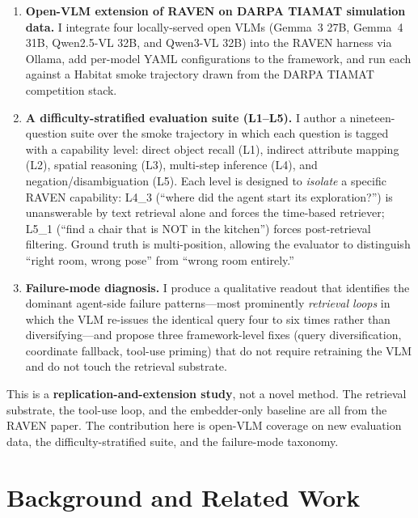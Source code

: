 \documentclass[12pt,letterpaper,oneside]{article}
\begin{document}
\begin{enumerate}
  \item \textbf{Open-VLM extension of RAVEN on DARPA TIAMAT
    simulation data.}  I integrate four locally-served open VLMs
    (Gemma~3 27B, Gemma~4 31B, Qwen2.5-VL 32B, and Qwen3-VL 32B) into
    the RAVEN harness via Ollama, add per-model YAML configurations
    to the framework, and run each against a Habitat smoke trajectory
    drawn from the DARPA TIAMAT competition stack.

  \item \textbf{A difficulty-stratified evaluation suite (L1--L5).} I
    author a nineteen-question suite over the smoke trajectory in
    which each question is tagged with a capability level: direct
    object recall (L1), indirect attribute mapping (L2), spatial
    reasoning (L3), multi-step inference (L4), and
    negation/disambiguation (L5).  Each level is designed to
    \emph{isolate} a specific RAVEN capability: L4\_3 (``where did the
    agent start its exploration?'') is unanswerable by text retrieval
    alone and forces the time-based retriever; L5\_1 (``find a chair
    that is NOT in the kitchen'') forces post-retrieval filtering.
    Ground truth is multi-position, allowing the evaluator to
    distinguish ``right room, wrong pose'' from ``wrong room
    entirely.''

  \item \textbf{Failure-mode diagnosis.} I produce a qualitative
    readout that identifies the dominant agent-side failure
    patterns---most prominently \emph{retrieval loops} in which the
    VLM re-issues the identical query four to six times rather than
    diversifying---and propose three framework-level fixes (query
    diversification, coordinate fallback, tool-use priming) that do
    not require retraining the VLM and do not touch the retrieval
    substrate.
\end{enumerate}

This is a \textbf{replication-and-extension study}, not a novel
method.  The retrieval substrate, the tool-use loop, and the
embedder-only baseline are all from the RAVEN paper.  The contribution
here is open-VLM coverage on new evaluation data, the
difficulty-stratified suite, and the failure-mode taxonomy.

\section{Background and Related Work}\label{sec:bg}
\end{document}
